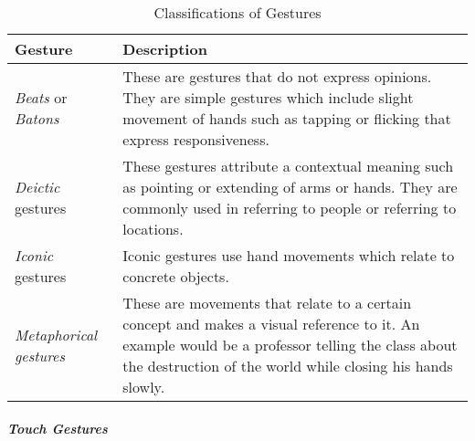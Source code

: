 \begin{longtable}{|p{3cm}|p{10.6cm}|}
\caption{Classifications of Gestures} \label{tab:classifications-of-gestures} \\
\hline

Gesture & Description \\ \hline

\textit{Beats} or \textit{Batons} & These are gestures that do not express opinions. They are simple gestures which include slight movement of hands such as tapping or flicking that express responsiveness. \\ \hline

\textit{Deictic} gestures & These gestures attribute a contextual meaning such as pointing or extending of arms or hands. They are commonly used in referring to people or referring to locations. \\ \hline

\textit{Iconic} gestures & Iconic gestures use hand movements which relate to concrete objects.  \\ \hline

\textit{Metaphorical gestures} & These are movements that relate to a certain concept and makes a visual reference to it. An example would be a professor telling the class about the destruction of the world while closing his hands slowly. \\ \hline

\end{longtable}

        
			\subparagraph{Touch Gestures}        

